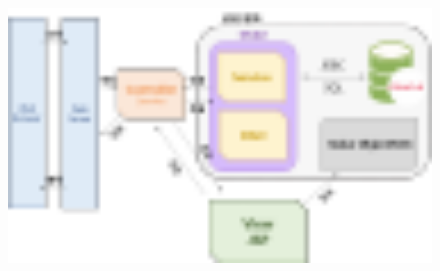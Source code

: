 
\begin{figure}[h]
    \begin{center}
        \includegraphics[width=16cm]{./Figure/Model2MVC.pdf}
    \end{center}
\end{figure}